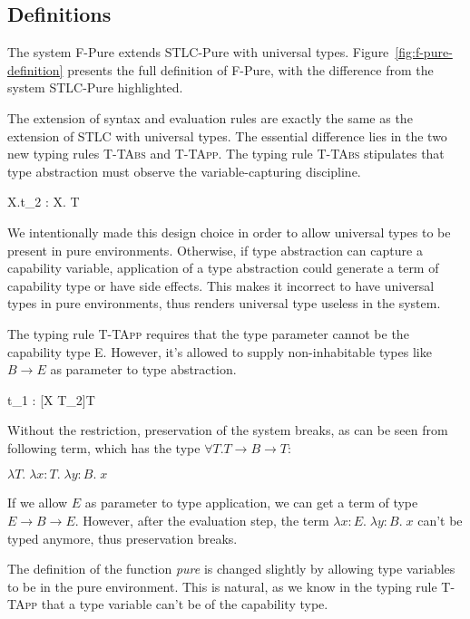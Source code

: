 \subsection{Definitions}

The system F-Pure extends STLC-Pure with universal
types. Figure~\ref{fig:f-pure-definition} presents the full definition
of F-Pure, with the difference from the system STLC-Pure highlighted.

The extension of syntax and evaluation rules are exactly the same as
the extension of STLC with universal types.  The essential difference
lies in the two new typing rules \textsc{T-TAbs} and
\textsc{T-TApp}. The typing rule \textsc{T-TAbs} stipulates that type
abstraction must observe the variable-capturing discipline.

{ \Gamma \vdash \lambda X.t_2 : \forall X. T }

We intentionally made this design choice in order to allow universal
types to be present in pure environments. Otherwise, if type
abstraction can capture a capability variable, application of a type
abstraction could generate a term of capability type or have side
effects. This makes it incorrect to have universal types in pure
environments, thus renders universal type useless in the system.

The typing rule \textsc{T-TApp} requires that the type parameter
cannot be the capability type E. However, it's allowed to supply
non-inhabitable types like $B \to E$ as parameter to type abstraction.


{ \Gamma \vdash t_1 \; [T_2] : [X \mapsto T_2]T }

Without the restriction, preservation of the system breaks, as can be
seen from following term, which has the type
$\forall T. T \to B \to T$:

\begin{center}
  $\lambda T. \; \lambda x:T. \; \lambda y:B. \; x$
\end{center}

If we allow $E$ as parameter to type application, we can get a term of
type $E \to B \to E$. However, after the evaluation step, the term
$\lambda x:E. \; \lambda y:B. \; x$ can't be typed anymore, thus
preservation breaks.

The definition of the function \emph{pure} is changed slightly by
allowing type variables to be in the pure environment. This is
natural, as we know in the typing rule \textsc{T-TApp} that a type
variable can't be of the capability type.

